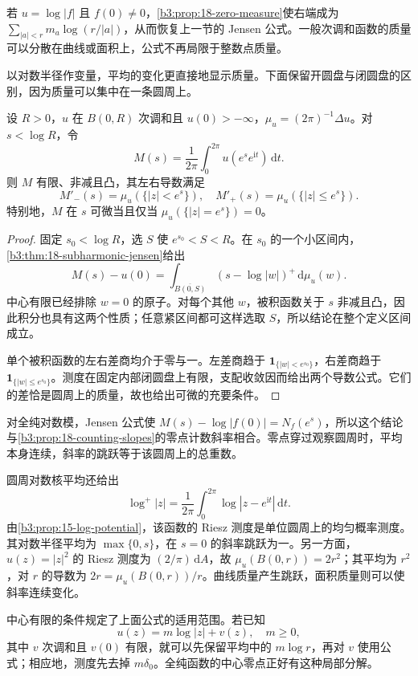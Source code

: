若 \(u=\log|f|\) 且 \(f(0)\ne0\)，\cref{b3:prop:18-zero-measure}使右端成为 \(\sum_{|a|<r}m_a\log(r/|a|)\)，从而恢复上一节的 Jensen 公式。一般次调和函数的质量可以分散在曲线或面积上，公式不再局限于整数点质量。

\ProseParagraphBreak

以对数半径作变量，平均的变化更直接地显示质量。下面保留开圆盘与闭圆盘的区别，因为质量可以集中在一条圆周上。

\begin{proposition}[对数半径上的单侧导数]\label{b3:prop:18-mean-slopes}
设 \(R>0\)，\(u\) 在 \(B(0,R)\) 次调和且 \(u(0)>-\infty\)，\(\mu_u=(2\pi)^{-1}\Delta u\)。对 \(s<\log R\)，令
\[
 M(s)=\frac1{2\pi}\int_0^{2\pi}u(e^se^{\mathrm it})\,\mathrm dt.
\]
则 \(M\) 有限、非减且凸，其左右导数满足
\[
 M'_-(s)=\mu_u(\{|z|<e^s\}),
 \quad M'_+(s)=\mu_u(\{|z|\le e^s\}).
\]
特别地，\(M\) 在 \(s\) 可微当且仅当 \(\mu_u(\{|z|=e^s\})=0\)。
\end{proposition}
\begin{proof}
固定 \(s_0<\log R\)，选 \(S\) 使 \(e^{s_0}<S<R\)。在 \(s_0\) 的一个小区间内，\cref{b3:thm:18-subharmonic-jensen}给出
\[
 M(s)-u(0)=\int_{\overline{B(0,S)}}(s-\log|w|)^+\,\mathrm d\mu_u(w).
\]
中心有限已经排除 \(w=0\) 的原子。对每个其他 \(w\)，被积函数关于 \(s\) 非减且凸，因此积分也具有这两个性质；任意紧区间都可这样选取 \(S\)，所以结论在整个定义区间成立。

单个被积函数的左右差商均介于零与一。左差商趋于 \(\mathbf1_{\{|w|<e^{s_0}\}}\)，右差商趋于 \(\mathbf1_{\{|w|\le e^{s_0}\}}\)。测度在固定内部闭圆盘上有限，支配收敛因而给出两个导数公式。它们的差恰是圆周上的质量，故也给出可微的充要条件。
\end{proof}

对全纯对数模，Jensen 公式使 \(M(s)-\log|f(0)|=N_f(e^s)\)，所以这个结论与\cref{b3:prop:18-counting-slopes}的零点计数斜率相合。零点穿过观察圆周时，平均本身连续，斜率的跳跃等于该圆周上的总重数。

圆周对数核平均还给出
\[
 \log^+|z|=\frac1{2\pi}\int_0^{2\pi}\log|z-e^{\mathrm it}|\,\mathrm dt.
\]
由\cref{b3:prop:15-log-potential}，该函数的 Riesz 测度是单位圆周上的均匀概率测度。其对数半径平均为 \(\max\{0,s\}\)，在 \(s=0\) 的斜率跳跃为一。另一方面，\(u(z)=|z|^2\) 的 Riesz 测度为 \((2/\pi)\,\mathrm dA\)，故 \(\mu_u(B(0,r))=2r^2\)；其平均为 \(r^2\)，对 \(r\) 的导数为 \(2r=\mu_u(B(0,r))/r\)。曲线质量产生跳跃，面积质量则可以使斜率连续变化。

\ProseParagraphBreak

中心有限的条件规定了上面公式的适用范围。若已知
\[
 u(z)=m\log|z|+v(z),
 \quad m\ge0,
\]
其中 \(v\) 次调和且 \(v(0)\) 有限，就可以先保留平均中的 \(m\log r\)，再对 \(v\) 使用公式；相应地，测度先去掉 \(m\delta_0\)。全纯函数的中心零点正好有这种局部分解。

